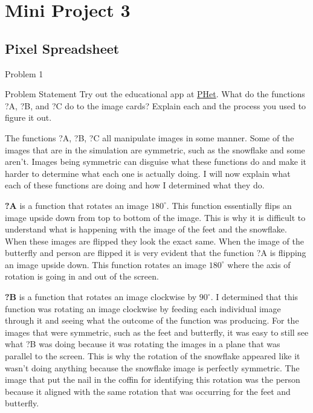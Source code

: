 \clearpage
\chapter{Mini Project 3}

\section{Pixel Spreadsheet}

\begin{problem}{Problem 1}
    \begin{statement}{Problem Statement}
        Try out the educational app at \href{https://phet.colorado.edu/sims/html/function-builder-basics/latest/function-builder-basics_en.html}{PHet}. What do the functions ?A, ?B, and ?C do to the image cards? Explain each and the process you used to figure it out.
    \end{statement}

    \begin{Highlight}[Solution]
        The functions ?A, ?B, ?C all manipulate images in some manner. Some of the images that are in the simulation are symmetric, such as the snowflake and some aren't. Images being symmetric can 
        disguise what these functions do and make it harder to determine what each one is actually doing. I will now explain what each of these functions are doing and how I determined what they do.

        \textbf{?A} is a function that rotates an image $180^{\circ}$. This function essentially flips an image upside down from top to bottom of the image. This is why it is difficult to understand 
        what is happening with the image of the feet and the snowflake. When these images are flipped they look the exact same. When the image of the butterfly and person are flipped it is very evident 
        that the function ?A is flipping an image upside down. This function rotates an image $180^{\circ}$ where the axis of rotation is going in and out of the screen.

        \textbf{?B} is a function that rotates an image clockwise by $90^{\circ}$. I determined that this function was rotating an image clockwise by feeding each individual image through it and seeing 
        what the outcome of the function was producing. For the images that were symmetric, such as the feet and butterfly, it was easy to still see what ?B was doing because it was rotating the images 
        in a plane that was parallel to the screen. This is why the rotation of the snowflake appeared like it wasn't doing anything because the snowflake image is perfectly symmetric. The image that 
        put the nail in the coffin for identifying this rotation was the person because it aligned with the same rotation that was occurring for the feet and butterfly.


\end{Highlight}
\end{problem}
